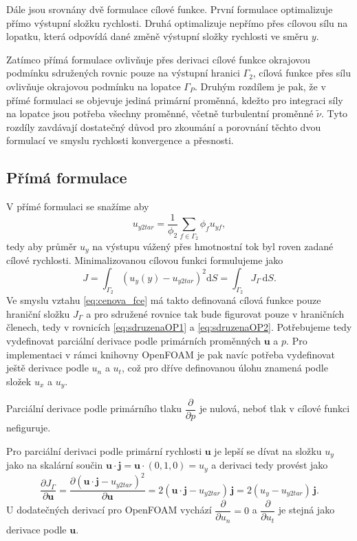 Dále jsou srovnány dvě formulace cílové funkce. První formulace optimalizuje přímo výstupní složku rychlosti. Druhá optimalizuje nepřímo přes cílovou sílu na lopatku, která odpovídá dané změně výstupní složky rychlosti ve směru $ y $.

Zatímco přímá formulace ovlivňuje přes derivaci cílové funkce okrajovou podmínku sdružených rovnic pouze na výstupní hranici $ \Gamma_2 $, cílová funkce přes sílu ovlivňuje okrajovou podmínku na lopatce $ \Gamma_P $. Druhým rozdílem je pak, že v přímé formulaci se objevuje jediná primární proměnná, kdežto pro integraci síly na lopatce jsou potřeba všechny proměnné, včetně turbulentní proměnné $ \widetilde{\nu} $. Tyto rozdíly zavdávají dostatečný důvod pro zkoumání a porovnání těchto dvou formulací ve smyslu rychlosti konvergence a přesnosti.

\subsection{Přímá formulace}

V přímé formulaci se snažíme aby
\begin{equation}
	u_{y2tar}=\dfrac{1}{\phi_2}\sum_{f\in\Gamma_2}\phi_f u_{yf},
\end{equation}
tedy aby průměr $ u_y $ na výstupu vážený přes hmotnostní tok byl roven zadané cílové rychlosti.
Minimalizovanou cílovou funkci formulujeme jako
\begin{equation}\label{eq:J_UyTarget}
	J = \int_{\Gamma_2}\left( u_y(y)-u_{y2tar} \right)^2\mathrm{d}S = \int_{\Gamma_2} J_\Gamma\, \mathrm{d}S.
\end{equation}
Ve smyslu vztahu \ref{eq:cenova_fce} má takto definovaná cílová funkce pouze hraniční složku $ J_\Gamma $ a pro sdružené rovnice tak bude figurovat pouze v hraničních členech, tedy v rovnicích \ref{eq:sdruzenaOP1} a \ref{eq:sdruzenaOP2}. Potřebujeme tedy vydefinovat parciální derivace podle primárních proměnných $ \mathbf{u} $ a $ p $. Pro implementaci v rámci knihovny OpenFOAM je pak navíc potřeba vydefinovat ještě derivace podle $ u_n $ a $ u_t $, což pro dříve definovanou úlohu znamená podle složek $ u_x $ a $ u_y $.

Parciální derivace podle primárního tlaku $ \dfrac{\partial}{\partial p} $ je nulová, neboť tlak v cílové funkci nefiguruje.

Pro parciální derivaci podle primární rychlosti $ \mathbf{u} $ je lepší se dívat na složku $ u_y $ jako na skalární součin $ \mathbf{u}\cdot \mathbf{j}=\mathbf{u}\cdot (0,1,0) = u_y$ a derivaci tedy provést jako
\begin{equation}\label{key}
\dfrac{\partial J_\Gamma}{\partial \mathbf{u}}
=
\dfrac{\partial \left( \mathbf{u}\cdot \mathbf{j}-u_{y2tar} \right)^2}{\partial \mathbf{u}}
=
2( \mathbf{u}\cdot \mathbf{j}-u_{y2tar} )\,\mathbf{j}
=
2( u_y-u_{y2tar} )\,\mathbf{j}.
\end{equation}
U dodatečných derivací pro OpenFOAM vychází $ \dfrac{\partial}{\partial u_n}=0 $ a $ \dfrac{\partial }{\partial u_t} $ je stejná jako derivace podle $ \mathbf{u} $.

